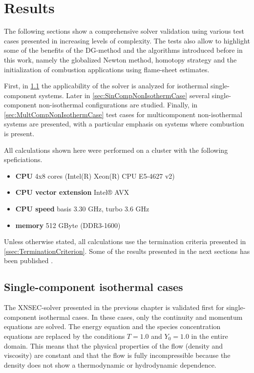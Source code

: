 \chapter{Results}	\label{ch:results}
\glsresetall
The following sections show a comprehensive solver validation using various test cases presented in increasing levels of complexity. The tests also allow to highlight some of the benefits of the DG-method and the algorithms introduced before in this work, namely the globalized Newton method, homotopy strategy and the initialization of combustion applications using flame-sheet estimates. 

First, in \cref{sec:SingleCompIsotCase} the applicability of the solver is analyzed for isothermal single-component systems. Later in \cref{sec:SinCompNonIsothermCase} several single-component non-isothermal configurations are studied. Finally, in \cref{sec:MultCompNonIsothermCase} test cases for multicomponent non-isothermal systems are presented, with a particular emphasis on systems where combustion is present.

All calculations shown here were performed on a cluster with the following speficiations.
\begin{itemize}
    \item \textbf{CPU} 4x8 cores (Intel(R) Xeon(R) CPU E5-4627 v2)
    \item \textbf{CPU vector extension} Intel® AVX
    \item \textbf{CPU speed} basis 3.30 GHz, turbo 3.6 GHz
    \item \textbf{memory} 512 GByte (DDR3-1600)
\end{itemize}
Unless otherwise stated, all calculations use the termination criteria presented in \cref{ssec:TerminationCriterion}.
Some of the results presented in the next sections has been published \parencite{gutierrez-jorqueraFullyCoupledHighorder2022}.
\section{Single-component isothermal cases}\label{sec:SingleCompIsotCase}
The XNSEC-solver presented in the previous chapter is validated first for single-component isothermal cases. In these cases, only the continuity and momentum equations are solved. The energy equation and the species concentration equations are replaced by the conditions $T = 1.0$ and $Y_0 = 1.0$ in the entire domain. This means that the physical properties of the flow (density and viscosity) are constant and that the flow is fully incompressible because the density does not show a thermodynamic or hydrodynamic dependence.


